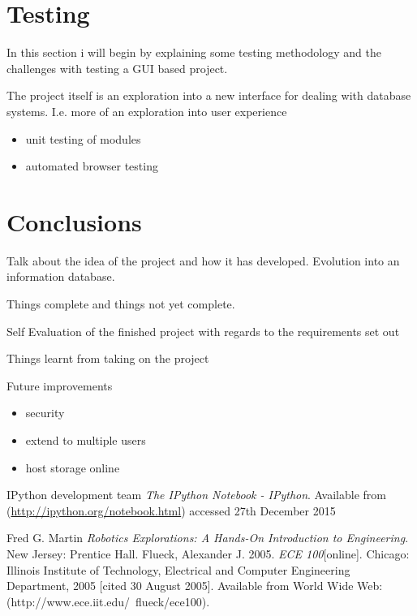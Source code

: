 \documentclass[a4paper, 11pt]{article}
\begin{document}
\section{Testing}

In this section i will begin by explaining some testing methodology and the
challenges with testing a GUI based project.

The project itself is an exploration into a new interface for dealing with
database systems. I.e. more of an exploration into user experience

\begin{itemize}
  \item{unit testing of modules}
  \item{automated browser testing}
\end{itemize}

\section{Conclusions}

Talk about the idea of the project and how it has developed.
Evolution into an information database.

Things complete and things not yet complete.

Self Evaluation of the finished project with regards to the requirements set out

Things learnt from taking on the project

Future improvements

\begin{itemize}
  \item{security}
  \item{extend to multiple users}
  \item{host storage online}
\end{itemize}

\begin{thebibliography}{9}

   IPython development team \emph{The IPython Notebook -
  IPython}. Available from
  (\href{http://ipython.org/notebook.html}{http://ipython.org/notebook.html})
  accessed 27th December 2015

\ifx
   Fred G. Martin \emph{Robotics Explorations: A Hands-On Introduction to Engineering}. New Jersey: Prentice Hall.
    Flueck, Alexander J. 2005. \emph{ECE 100}[online]. Chicago: Illinois Institute of Technology, Electrical and Computer Engineering Department, 2005 [cited 30
  August 2005]. Available from World Wide Web: (http://www.ece.iit.edu/~flueck/ece100).
\fi

\end{thebibliography}
\end{document}
